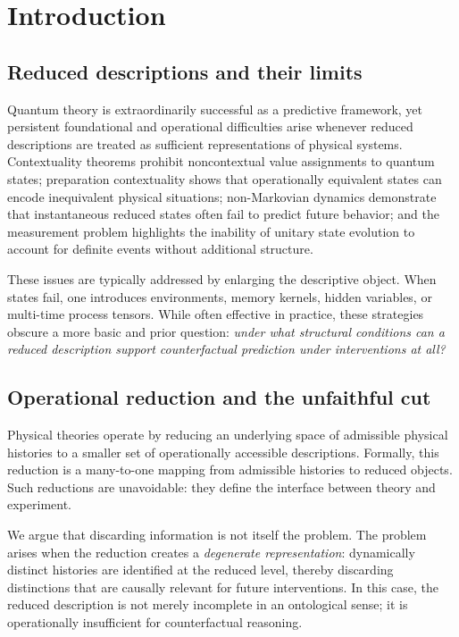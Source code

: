 \section{Introduction}

\subsection{Reduced descriptions and their limits}

Quantum theory is extraordinarily successful as a predictive framework, yet persistent foundational and operational difficulties arise whenever reduced descriptions are treated as sufficient representations of physical systems. Contextuality theorems prohibit noncontextual value assignments to quantum states; preparation contextuality shows that operationally equivalent states can encode inequivalent physical situations; non-Markovian dynamics demonstrate that instantaneous reduced states often fail to predict future behavior; and the measurement problem highlights the inability of unitary state evolution to account for definite events without additional structure.

These issues are typically addressed by enlarging the descriptive object. When states fail, one introduces environments, memory kernels, hidden variables, or multi-time process tensors. While often effective in practice, these strategies obscure a more basic and prior question: \emph{under what structural conditions can a reduced description support counterfactual prediction under interventions at all?}

\subsection{Operational reduction and the unfaithful cut}

Physical theories operate by reducing an underlying space of admissible physical histories to a smaller set of operationally accessible descriptions. Formally, this reduction is a many-to-one mapping from admissible histories to reduced objects. Such reductions are unavoidable: they define the interface between theory and experiment.

We argue that discarding information is not itself the problem. The problem arises when the reduction creates a \emph{degenerate representation}: dynamically distinct histories are identified at the reduced level, thereby discarding distinctions that are causally relevant for future interventions. In this case, the reduced description is not merely incomplete in an ontological sense; it is operationally insufficient for counterfactual reasoning.

